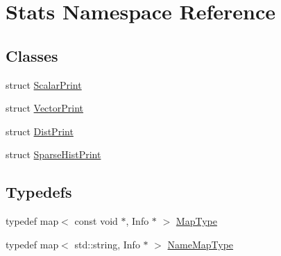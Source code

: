 \hypertarget{namespaceStats}{
\section{Stats Namespace Reference}
\label{namespaceStats}
}
\subsection*{Classes}
\begin{DoxyCompactItemize}
\item 
struct \hyperlink{structStats_1_1ScalarPrint}{ScalarPrint}
\item 
struct \hyperlink{structStats_1_1VectorPrint}{VectorPrint}
\item 
struct \hyperlink{structStats_1_1DistPrint}{DistPrint}
\item 
struct \hyperlink{structStats_1_1SparseHistPrint}{SparseHistPrint}
\end{DoxyCompactItemize}
\subsection*{Typedefs}
\begin{DoxyCompactItemize}
\item 
typedef map$<$ const void $\ast$, Info $\ast$ $>$ \hyperlink{namespaceStats_abf12e88b5899310c1adcf5be61d6bee3}{MapType}
\item 
typedef map$<$ std::string, Info $\ast$ $>$ \hyperlink{namespaceStats_aa5595c5604b2fec03e55b1f32b521595}{NameMapType}
\end{DoxyCompactItemize}
